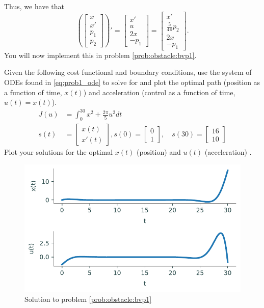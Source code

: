 Thus, we have that
\begin{equation}\label{eq:prob1_ode}
	\left( \begin{bmatrix}x\\x'\\p_1\\p_2\end{bmatrix} \right)' = \begin{bmatrix}x'\\u\\2x\\-p_1\end{bmatrix} = \begin{bmatrix}x'\\ \frac{5}{4\pi}p_2\\2x\\-p_1\end{bmatrix}.
\end{equation}
You will now implement this in problem \ref{prob:obstacle:bvp1}.

\begin{problem}
\label{prob:obstacle:bvp1}
Given the following cost functional and boundary conditions, use the system of ODEs found in \ref{eq:prob1_ode} to solve for and plot the optimal path (position as a function of time, $x(t)$) and acceleration (control as a function of time, $u(t)=\ddot x(t)$).
\begin{align*}
    J(u) &= \int_0^{30} x^2 + \frac{2\pi}{5}u^2dt \\
    s(t) &= \begin{bmatrix}x(t)\\x'(t) \end{bmatrix}, s(0) = \begin{bmatrix}0\\1 \end{bmatrix}, \quad s(30) = \begin{bmatrix}16\\10 \end{bmatrix}
\end{align*}
Plot your solutions for the optimal $x(t)$ (position) and $u(t)$ (acceleration) .
\end{problem}

\begin{figure}[H]
    \centering
    \includegraphics[width=\textwidth]{figures/OA_prob1.pdf}
    \caption{Solution to problem \ref{prob:obstacle:bvp1}}
    \label{fig:OA_prob1}
\end{figure}

